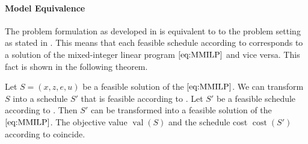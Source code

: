 \paragraph{Model Equivalence} \parfill

The problem formulation as developed in  is equivalent to to the problem setting as stated in . This means that each feasible schedule according to  corresponds to a solution of the mixed-integer linear program $\eqref{eq:MMILP}$ and vice versa. This fact is shown in the following theorem.

\begin{theorem}
\label{thm:equivalence_setting_mmilp}

Let ${S=\left(x,z,e,u\right)}$ be a feasible solution of the $\eqref{eq:MMILP}$. We can transform $S$ into a schedule $S'$ that is feasible according to . Let $S'$ be a feasible schedule according to . Then $S'$ can be transformed into a feasible solution of the $\eqref{eq:MMILP}$. The objective value $\operatorname{val}(S)$ and the schedule cost $\operatorname{cost}\left(S'\right)$ according to  coincide.

\end{theorem}

